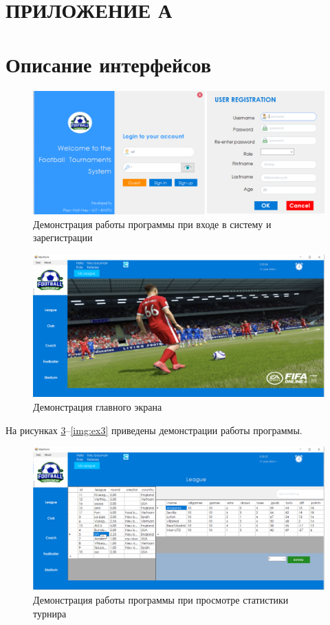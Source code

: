 \section*{\centering ПРИЛОЖЕНИЕ А}

\section*{Описание интерфейсов}

\begin{figure}[h]
	\centering
	\includegraphics[height=0.25\textheight]{img/examples/demon1.png}
	\caption{Демонстрация работы программы при входе в систему и зарегистрации}
	\label{img:ex1}
\end{figure}

\begin{figure}[h]
	\centering
	\includegraphics[height=0.3\textheight]{img/examples/demon2.png}
	\caption{Демонстрация главного экрана}
	\label{img:ex2}
\end{figure}
\clearpage
На рисунках \ref{img:ex4}--\ref{img:ex3} приведены демонстрации работы программы.
\begin{figure}[h]
	\centering
	\includegraphics[height=0.3\textheight]{img/examples/demon3.png}
	\caption{Демонстрация работы программы при просмотре статистики турнира}
	\label{img:ex4}
\end{figure}

